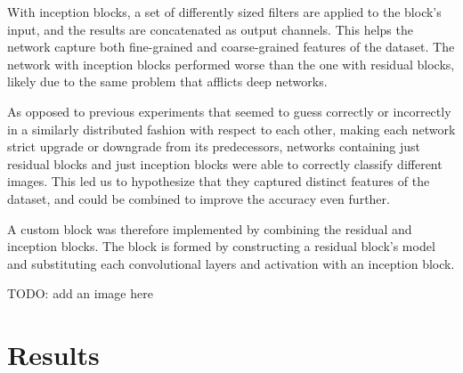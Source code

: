 \documentclass[11pt]{article}
\begin{document}
\begin{multicols}{2}
      With inception blocks, a set of differently sized filters are applied to the block's 
      input, and the results are concatenated as output channels. This helps the network 
      capture both fine-grained and coarse-grained features of the dataset. The network
      with inception blocks performed worse than the one with residual blocks, likely
      due to the same problem that afflicts deep networks.

      As opposed to previous experiments that seemed to guess correctly or
      incorrectly in a similarly distributed fashion with respect to each
      other, making each network strict upgrade or downgrade from its predecessors, 
      networks containing just residual blocks and just inception blocks were able to correctly
      classify different images. This led us to hypothesize that they captured distinct 
      features of the dataset, and could be combined to improve the accuracy even further.

      A custom block was therefore implemented by combining the residual and
      inception blocks. The block is formed by constructing a residual block's model and
      substituting each convolutional layers and activation with an inception block.

      TODO: add an image here

      \label{sec:results}
      \section{Results}


\end{multicols}
\end{document}
